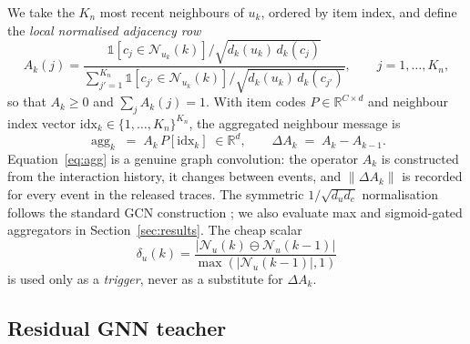 \documentclass[preprint,12pt]{elsarticle}
\begin{document}
We take the $K_n$ most recent neighbours of $u_k$, ordered by item index, and define the \emph{local normalised adjacency row}
\begin{equation}
A_k(j)=\frac{\mathbb 1[c_j\in\mathcal N_{u_k}(k)]\big/\sqrt{d_k(u_k)\,d_k(c_j)}}
{\sum_{j'=1}^{K_n}\mathbb 1[c_{j'}\in\mathcal N_{u_k}(k)]/\sqrt{d_k(u_k)\,d_k(c_{j'})}},
\qquad j=1,\ldots,K_n,
\label{eq:adj}
\end{equation}
so that $A_k\ge 0$ and $\sum_j A_k(j)=1$. With item codes $P\in\mathbb R^{C\times d}$ and neighbour index vector $\mathrm{idx}_k\in\{1,\ldots,K_n\}^{K_n}$, the aggregated neighbour message is
\begin{equation}
\operatorname{agg}_k \;=\; A_k\,P[\mathrm{idx}_k]\;\in\mathbb R^{d},
\qquad \Delta A_k \;=\; A_k-A_{k-1}.
\label{eq:agg}
\end{equation}
Equation~\eqref{eq:agg} is a genuine graph convolution: the operator $A_k$ is constructed from the interaction history, it changes between events, and $\|\Delta A_k\|$ is recorded for every event in the released traces. The symmetric $1/\sqrt{d_u d_c}$ normalisation follows the standard GCN construction \cite{kipf2017gcn}; we also evaluate max and sigmoid-gated aggregators in Section~\ref{sec:results}. The cheap scalar
\begin{equation}
\delta_{u}(k)=\frac{|\mathcal N_u(k)\ominus\mathcal N_u(k-1)|}{\max(|\mathcal N_u(k-1)|,1)}
\label{eq:delta}
\end{equation}
is used only as a \emph{trigger}, never as a substitute for $\Delta A_k$.

\subsection{Residual GNN teacher}
\label{sec:teacher}
\end{document}
